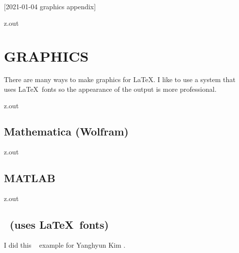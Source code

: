 [2021-01-04 graphics appendix]

\begin{VerbatimOut}{z.out}
\chapter{GRAPHICS}

There are many ways to make graphics for \LaTeX.
I like to use a system that uses \LaTeX\ fonts
so the appearance of the output is more professional.
\end{VerbatimOut}

\MyIOT


\begin{VerbatimOut}{z.out}

\section{Mathematica (Wolfram)}
\end{VerbatimOut}

\MyIOT


\begin{VerbatimOut}{z.out}

\section{MATLAB}
\end{VerbatimOut}

\MyIOT


\begin{VerbatimOut}{z.out}

\section{\METAPOST\ (uses \LaTeX\ fonts)}

I did this \METAPOST\ \cite{metapost} example
for Yanghyun Kim \cite{kim2009}.
\end{VerbatimOut}

\MyIOT



